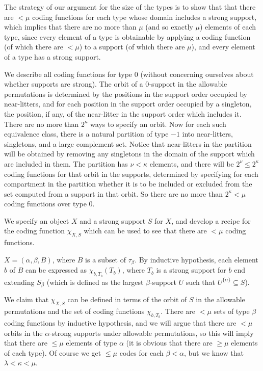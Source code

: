 The strategy of our argument for the size of the types is to show that that there are $<\mu$ coding functions for each type whose domain includes a strong support, which implies that there are no more than $\mu$ (and so exactly $\mu$) elements of each type, since every element of a type is obtainable by applying a coding function (of which there are $<\mu$) to a support (of which there are $\mu$), and every element of a type has a strong support.

We describe all coding functions for type 0 (without concerning ourselves about whether supports are strong).  The orbit of a 0-support in the allowable permutations is determined by the positions in the support order occupied by near-litters, and for each position in the support order occupied by a singleton, the position, if any, of the near-litter in the support order which includes it.  There are no more than $2^\kappa$ ways to specify an orbit.  Now for each such equivalence class, there is a natural partition of type $-1$ into near-litters, singletons, and a large complement set.  Notice that near-litters in the partition will be obtained by removing any singletons in the domain of the support which are included in them.  The partition has $\nu<\kappa$ elements, and there will be $2^\nu\leq 2^\kappa$ coding functions for that orbit in the supports, determined by specifying for each compartment in the partition whether it is to be included or excluded from the set computed from a support in that orbit.  So there are no more than $2^\kappa<\mu$ coding functions over type 0.

We specify an object $X$ and a strong support $S$ for $X$, and develop a recipe for the coding function $\chi_{X,S}$ which can be used to see that there are $<\mu$ coding functions.

$X = (\alpha,\beta,B)$, where $B$ is a subset of $\tau_\beta$.  By inductive hypothesis, each element $b$ of $B$ can be expressed as $\chi_{b,T_b}(T_b)$, where $T_b$ is a strong support for $b$ end extending $S_\beta$ (which is defined as the largest $\beta$-support $U$ such that $U^{\{\alpha\}} \subseteq S$).

We claim that $\chi_{X,S}$ can be defined in terms of the orbit of $S$ in the allowable permutations and the set of coding functions $\chi_{b,T_b}$.  There are $<\mu$ sets of type $\beta$ coding functions by inductive hypothesis, and we will argue that there are $<\mu$ orbits in the $\alpha$-strong supports under allowable permutations, so this will imply that there are $\leq \mu$ elements of type $\alpha$ (it is obvious that there are $\geq \mu$ elements of each type).
Of course we get $\leq \mu$ codes for each $\beta<\alpha$, but we know that $\lambda<\kappa<\mu$.

